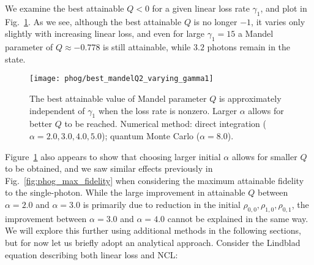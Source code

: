 We examine the best attainable $Q<0$ for a given linear loss rate $\gamma_1$, and plot in Fig.~\ref{fig:phog_ncl_best_Q_gamma1}. As we see, although the best attainable $Q$ is no longer $-1$, it varies only slightly with increasing linear loss, and even for large $\gamma_1=15$ a Mandel parameter of $Q \approx -0.778$ is still attainable, while $3.2$ photons remain in the state.


\begin{figure}
\captionsetup{width=\linewidth}
\centering
\texttt{[image: phog/best\_mandelQ2\_varying\_gamma1]}
\caption{\label{fig:phog_ncl_best_Q_gamma1} The best attainable value of Mandel parameter $Q$ is approximately independent of $\gamma_1$ when the loss rate is nonzero. Larger $\alpha$ allows for better $Q$ to be reached. Numerical method: direct integration ($\alpha = 2.0, 3.0, 4.0, 5.0$); quantum Monte Carlo ($\alpha = 8.0$).}
\end{figure}

Figure~\ref{fig:phog_ncl_best_Q_gamma1} also appears to show that choosing larger initial $\alpha$ allows for smaller $Q$ to be obtained, and we saw similar effects previously in Fig.~\ref{fig:phog_max_fidelity} when considering the maximum attainable fidelity to the single-photon. While the large improvement in attainable $Q$ between $\alpha=2.0$ and $\alpha=3.0$ is primarily due to reduction in the initial $\rho_{0, 0}, \rho_{1, 0}, \rho_{0, 1}$, the improvement between $\alpha=3.0$ and $\alpha=4.0$ cannot be explained in the same way. We will explore this further using additional methods in the following sections, but for now let us briefly adopt an analytical approach. Consider the Lindblad equation describing both linear loss and NCL:

